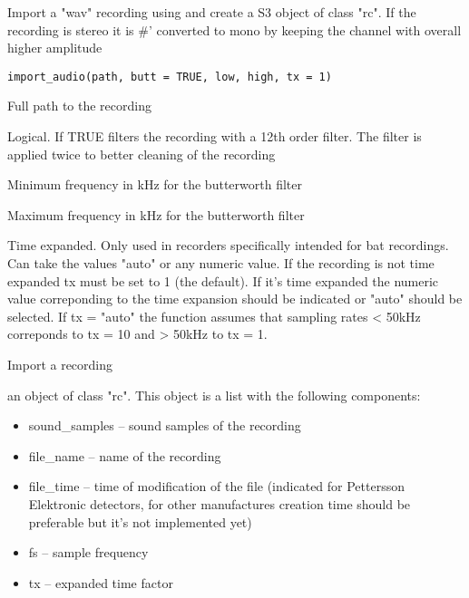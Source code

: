 \documentclass[letterpaper]{book}
\begin{document}
%
\begin{Description}\relax
Import a "wav" recording using 
and create a S3 object of class "rc". If the recording is stereo it is
\#' converted to mono by keeping the channel with overall higher amplitude
\end{Description}
%
\begin{Usage}
\begin{verbatim}
import_audio(path, butt = TRUE, low, high, tx = 1)
\end{verbatim}
\end{Usage}
%
\begin{Arguments}
\begin{ldescription}
\item[\code{path}] Full path to the recording

\item[\code{butt}] Logical. If TRUE filters the recording with a 12th order
filter. The filter is applied twice to better cleaning of the recording

\item[\code{low}] Minimum frequency in kHz for the butterworth filter

\item[\code{high}] Maximum frequency in kHz for the butterworth filter

\item[\code{tx}] Time expanded. Only used in recorders specifically intended for
bat recordings. Can take the values "auto" or any numeric value. If the
recording is not time expanded tx must be set to 1 (the default). If it's
time expanded the numeric value correponding to the time expansion should
be indicated or "auto" should be selected. If tx = "auto" the function
assumes that sampling rates < 50kHz correponds to
tx = 10 and > 50kHz to tx = 1.
\end{ldescription}
\end{Arguments}
%
\begin{Details}\relax
Import a recording
\end{Details}
%
\begin{Value}
an object of class "rc". This object is a list
with the following components:
\begin{itemize}

\item{} sound\_samples -- sound samples of the recording
\item{} file\_name -- name of the recording
\item{} file\_time -- time of modification of the file (indicated for
Pettersson Elektronic detectors, for other manufactures creation time should
be preferable but it's not implemented yet)
\item{} fs -- sample frequency
\item{} tx -- expanded time factor

\end{itemize}

\end{Value}
\end{document}
